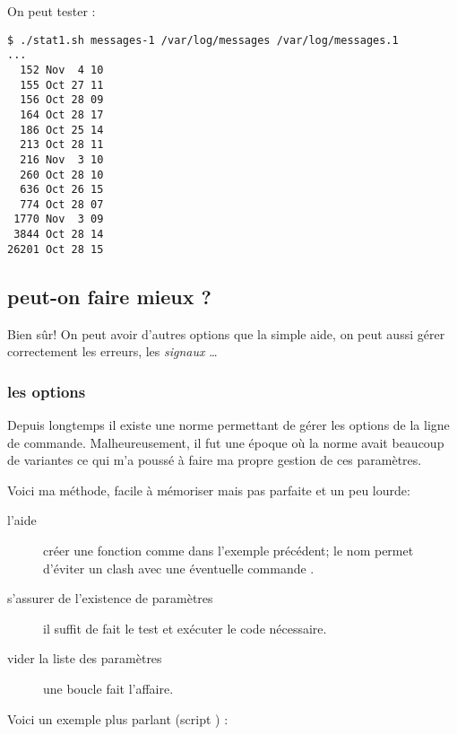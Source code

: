 On peut tester :

\begin{lstlisting}
$ ./stat1.sh messages-1 /var/log/messages /var/log/messages.1
...
  152 Nov  4 10
  155 Oct 27 11
  156 Oct 28 09
  164 Oct 28 17
  186 Oct 25 14
  213 Oct 28 11
  216 Nov  3 10
  260 Oct 28 10
  636 Oct 26 15
  774 Oct 28 07
 1770 Nov  3 09
 3844 Oct 28 14
26201 Oct 28 15
\end{lstlisting}

\subsection{peut-on faire mieux ?}
Bien sûr! On peut avoir d'autres options que la simple aide, on peut aussi gérer correctement les erreurs, les \emph{signaux \unix}\ldots

\subsubsection{les options}
Depuis longtemps il existe une norme \POSIX permettant de gérer les options de la ligne
de commande. Malheureusement, il fut une époque où la norme avait beaucoup de variantes
ce qui m'a poussé à faire ma propre gestion de ces paramètres.

Voici ma méthode, facile à mémoriser mais pas parfaite et un peu lourde:

\begin{description}
    \item[l'aide] créer une fonction  comme dans l'exemple précédent;
    le nom  permet d'éviter un clash avec une éventuelle commande .
    \item[s'assurer de l'existence de paramètres] il suffit de fait le test \code{[ \$\# -eq 0 ]} et
    exécuter le code nécessaire.
    \item[vider la liste des paramètres] une boucle  fait l'affaire.
\end{description}

Voici un exemple plus parlant (script ) :
